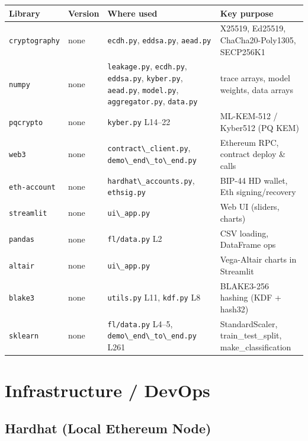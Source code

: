\documentclass[11pt,a4paper]{article}
\newcommand{\code}[1]{\lstinline[basicstyle=\ttfamily\small]!#1!}
\begin{document}
\begin{longtable}{L{2.8cm} L{1.8cm} L{4.5cm} L{5.2cm}}
\toprule
\textbf{Library} & \textbf{Version} & \textbf{Where used} & \textbf{Key purpose} \\
\midrule
\endhead
\bottomrule
\endfoot
\code{cryptography} & none & \code{ecdh.py}, \code{eddsa.py}, \code{aead.py} & X25519, Ed25519, ChaCha20-Poly1305, SECP256K1 \\
\code{numpy}        & none & \code{leakage.py}, \code{ecdh.py}, \code{eddsa.py}, \code{kyber.py}, \code{aead.py}, \code{model.py}, \code{aggregator.py}, \code{data.py} & trace arrays, model weights, data arrays \\
\code{pqcrypto}     & none & \code{kyber.py} L14--22 & ML-KEM-512 / Kyber512 (PQ KEM) \\
\code{web3}         & none & \code{contract\_client.py}, \code{demo\_end\_to\_end.py} & Ethereum RPC, contract deploy \& calls \\
\code{eth-account}  & none & \code{hardhat\_accounts.py}, \code{ethsig.py} & BIP-44 HD wallet, Eth signing/recovery \\
\code{streamlit}    & none & \code{ui\_app.py} & Web UI (sliders, charts) \\
\code{pandas}       & none & \code{fl/data.py} L2 & CSV loading, DataFrame ops \\
\code{altair}       & none & \code{ui\_app.py} & Vega-Altair charts in Streamlit \\
\code{blake3}       & none & \code{utils.py} L11, \code{kdf.py} L8 & BLAKE3-256 hashing (KDF + hash32) \\
\code{sklearn}      & none & \code{fl/data.py} L4--5, \code{demo\_end\_to\_end.py} L261 & StandardScaler, train\_test\_split, make\_classification \\
\end{longtable}

\section{Infrastructure / DevOps}

\subsection{Hardhat (Local Ethereum Node)}
\end{document}
